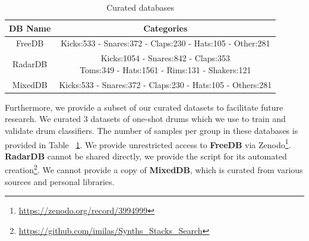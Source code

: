 \documentclass[runningheads,a4paper]{llncs}
\begin{document}
\begin{table}[tbp]
\centering
\caption{Curated databases}
\begin{tabular}{ |c|c| } 
\hline
DB Name & Categories                                                        \\ \hline
FreeDB  & Kicks:533 - Snares:372 - Claps:230 - Hats:105 - Other:281            \\ \hline
RadarDB & \makecell{Kicks:1054 - Snares:842 - Claps:353 \\ Toms:349 - Hats:1561 - Rims:131 - Shakers:121} \\ \hline
MixedDB & Kicks:533 - Snares:372 - Claps:230 - Hats:105 - Others:281                     \\ \hline
\end{tabular}
    \label{table:drumdb}
\end{table}

Furthermore, we provide a subset of our curated datasets to facilitate future research. We curated 3 datasets of one-shot drums which we use to train and validate drum classifiers. The number of samples per group in these databases is provided in Table ~\ref{table:drumdb}. We provide unrestricted access to \textbf{FreeDB} via Zenodo\footnote{\url{https://zenodo.org/record/3994999}}.
\textbf{RadarDB} cannot be shared directly, we provide the script for its automated creation\footnote{\url{https://github.com/imilas/Synths_Stacks_Search}}. We cannot provide a copy of \textbf{MixedDB}, which is curated from various sources and personal libraries. 
\end{document}
